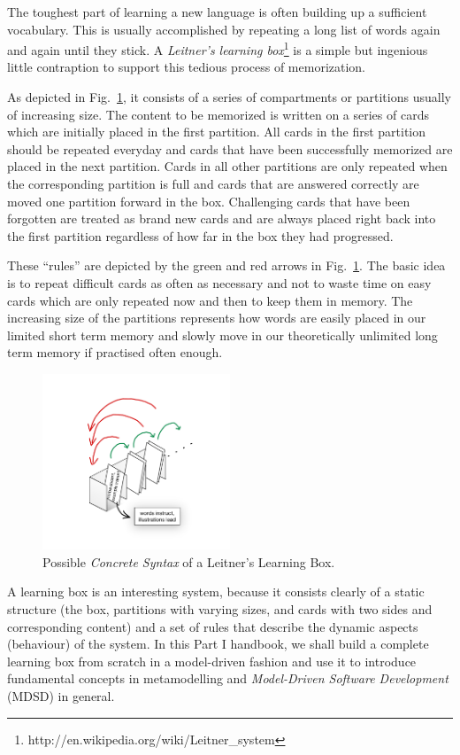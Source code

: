 \genHeader

The toughest part of learning a new language  is often building up a sufficient vocabulary.
This is usually accomplished by repeating a long list of words again and again until they stick.
A \emph{Leitner's learning box}\footnote{http://en.wikipedia.org/wiki/Leitner\_system} is a simple but ingenious little contraption to support this tedious process of memorization.

As depicted in Fig.~\ref{fig:membox_illustration}, it consists of a series of compartments or partitions usually of increasing size.
The content to be memorized is written on a series of cards  which are initially placed in the first partition.
All cards in the first  partition should be repeated everyday and cards that have been successfully memorized are placed in the next partition.
Cards in all other partitions are only repeated when the corresponding partition is full and cards that are  answered correctly are moved one partition forward in the box.
Challenging  cards that have been forgotten are treated as brand new cards and are always  placed right back into the first partition regardless of how far in the box they  had progressed.

These ``rules'' are depicted by the green and red arrows in  Fig.~\ref{fig:membox_illustration}.
The basic idea is to repeat difficult cards as often as necessary and not to waste time on easy cards which
are only repeated now and then to keep them in memory.
The increasing size of the partitions represents how words are easily placed in our limited short term memory and slowly move in our theoretically unlimited long term memory if practised often enough.

 \begin{figure}[htp]
 \begin{center}
   \includegraphics[width=0.5\textwidth]{../membox_illustration}
   \caption[]{Possible \emph{Concrete Syntax} of a Leitner's Learning Box.}
   \label{fig:membox_illustration}
 \end{center}
 \end{figure}
 \FloatBarrier

A learning box is an interesting system, because it consists clearly of a static structure (the box, partitions with varying sizes, and cards with two sides and corresponding content) and a set of rules that describe the dynamic aspects
(behaviour) of the system.
In this Part I handbook, we shall build a complete learning box from scratch in a model-driven fashion and use it to introduce fundamental concepts in metamodelling and \emph{Model-Driven Software Development} (MDSD) in general.
